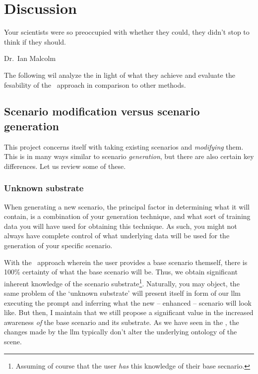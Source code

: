 \chapter{Discussion}\label{sec:discussion}

\epigraph{Your scientists were so preoccupied with whether they could, they didn't stop to think if they should.}{Dr.~Ian Malcolm}

The following wil analyze the  in light of what they achieve and evaluate the
fesability of the \hefe~approach in comparison to other methods.

\section{Scenario modification versus scenario generation}

This project concerns itself with taking existing scenarios and \emph{modifying} them. This is in
many ways similar to scenario \emph{generation}, but there are also certain key differences. Let us
review some of these.

\subsection{Unknown substrate}

When generating a new scenario, the principal factor in determining what it will contain, is a
combination of your generation technique, and what sort of training data you will have used for
obtaining this technique. As such, you might not always have complete control of what underlying
data will be used for the generation of your specific scenario.

With the \hefe~approach wherein the user provides a base scenario themself, there is \num{100}\%
certainty of what the base scenario will be. Thus, we obtain significant inherent knowledge of the
scenario substrate\footnote{Assuming of course that the user \emph{has} this knowledge of their base
    secnario.}. Naturally, you may object, the same problem of the `unknown substrate' will present
itself in form of our \acrshort{llm} executing the prompt and inferring what the new -- enhanced --
scenario will look like. But then, I maintain that we still propose a significant value in the
increased awareness \emph{of} the base scenario and its substrate. As we have seen in the
, the changes made by the \acrshort{llm} typically don't alter the underlying
ontology of the scene.


